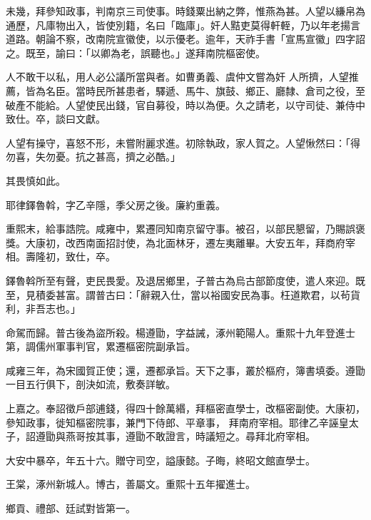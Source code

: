 \begin{pinyinscope}
 未幾，拜參知政事，判南京三司使事。時錢粟出納之弊，惟燕為甚。人望以縑帛為通歷，凡庫物出入，皆使別籍，名曰「臨庫」。奸人黠吏莫得軒輊，乃以年老揚言道路。朝論不察，改南院宣徽使，以示優老。逾年，天祚手書「宣馬宣徽」四字詔之。既至，諭曰：「以卿為老，誤聽也。」遂拜南院樞密使。



 人不敢干以私，用人必公議所當與者。如曹勇義、虞仲文嘗為奸
 人所擠，人望推薦，皆為名臣。當時民所甚患者，驛遞、馬牛、旗鼓、鄉正、廳隸、倉司之役，至破產不能給。人望使民出錢，官自募役，時以為便。久之請老，以守司徒、兼侍中致仕。卒，談曰文獻。



 人望有操守，喜怒不形，未嘗附麗求進。初除執政，家人賀之。人望愀然曰：「得勿喜，失勿憂。抗之甚高，擠之必酷。」



 其畏慎如此。



 耶律鐸魯斡，字乙辛隱，季父房之後。廉約重義。



 重熙末，給事誥院。咸雍中，累遷同知南京留守事。被召，以部民懇留，乃賜誤褒獎。大康初，改西南面招討使，為北面林牙，遷左夷離畢。大安五年，拜商府宰相。壽隆初，致仕，卒。



 鐸魯斡所至有聲，吏民畏愛。及退居鄉里，子普古為烏古部節度使，遣人來迎。既至，見積委甚富。謂普古曰：「辭親入仕，當以裕國安民為事。枉道欺君，以茍貨利，非吾志也。」



 命駕而歸。普古後為盜所殺。楊遵勖，字益誡，涿州範陽人。重熙十九年登進士第，調儒州軍事判官，累遷樞密院副承旨。



 咸雍三年，為宋國賀正使；還，遷都承旨。天下之事，叢於樞府，簿書填委。遵勖一目五行俱下，剖決如流，敷奏詳敏。



 上嘉之。奉詔徵戶部逋錢，得四十餘萬緡，拜樞密直學士，改樞密副使。大康初，參知政事，徙知樞密院事，兼門下侍郎、平章事，
 拜南府宰相。耶律乙辛誣皇太子，詔遵勖與燕哥按其事，遵勖不敢證言，時議短之。尋拜北府宰相。



 大安中暴卒，年五十六。贈守司空，謚康懿。子晦，終昭文館直學士。



 王棠，涿州新城人。博古，善屬文。重熙十五年擢進士。



 鄉貢、禮部、廷試對皆第一。




\end{pinyinscope}
